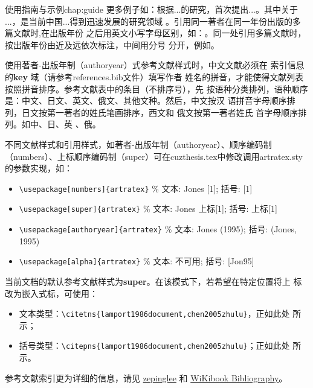 \begin{cuzchapter}{使用指南与示例}{chap:guide}
	更多例子如：\citet{walls2013drought}根据...的研究，首次提出...。其中关于
	...\citep{walls2013drought}，是当前中国...得到迅速发展的研究领域
	\citep{chen1980zhongguo}。引用同一著者在同一年份出版的多篇文献时,在出版年份
	之后用英文小写字母区别，如：\citep{yuan2012lana, yuan2012lanb,
		yuan2012lanc}。同一处引用多篇文献时，按出版年份由近及远依次标注，中间用分号
	分开，例如\citep{chen1980zhongguo, stamerjohanns2009mathml, hls2012jinji,
		niu2013zonghe}。

	使用著者-出版年制（authoryear）式参考文献样式时，中文文献必须在
	索引信息的\textbf{key} 域（请参考references.bib文件）填写作者
	姓名的拼音，才能使得文献列表按照拼音排序。参考文献表中的条目（不排序号），先
	按语种分类排列，语种顺序是：中文、日文、英文、俄文、其他文种。然后，中文按汉
	语拼音字母顺序排列，日文按第一著者的姓氏笔画排序，西文和 俄文按第一著者姓氏
	首字母顺序排列。如中\citep{niu2013zonghe}、日\citep{Bohan1928}、英
	\citep{stamerjohanns2009mathml}、俄\citep{Dubrovin1906}。

	不同文献样式和引用样式，如著者-出版年制（authoryear）、顺序编码制
	（numbers）、上标顺序编码制（super）可在cuzthesis.tex中修改调用artratex.sty
	的参数实现，如：
	\begin{itemize}
		\item \verb+\usepackage[numbers]{artratex}+ $\%$ 文本: Jones [1]; 括号: [1]
		\item \verb+\usepackage[super]{artratex}+ $\%$ 文本: Jones 上标[1]; 括号: 上标[1]
		\item \verb+\usepackage[authoryear]{artratex}+ $\%$ 文本: Jones (1995); 括号: (Jones, 1995)
		\item \verb+\usepackage[alpha]{artratex}+ $\%$ 文本: 不可用; 括号: [Jon95]
	\end{itemize}

	当前文档的默认参考文献样式为\textbf{super}。在该模式下，若希望在特定位置将上
	标改为嵌入式标，可使用：

	\begin{itemize}
		\item 文本类型：\verb|\citetns{lamport1986document,chen2005zhulu}|，正如此处
		      所示；
		\item 括号类型：\verb|\citepns{lamport1986document,chen2005zhulu}|；正如此处
		      所示。
	\end{itemize}

	参考文献索引更为详细的信息，请见
	\href{https://github.com/zepinglee/gbt7714-bibtex-style}{zepinglee} 和
	\href{https://en.wikibooks.org/wiki/LaTeX/Bibliography_Management}{WiKibook
		Bibliography}。


\end{cuzchapter}
